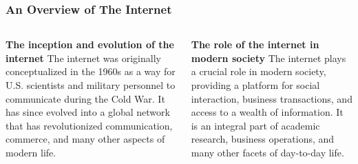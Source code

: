 \documentclass[5pt]{beamer}
\begin{document}
\begin{frame}
\frametitle{An Overview of The Internet}
\begin{columns}
\begin{column}{0.45\textwidth}
\begin{block}{\textbf{The inception and evolution of the internet}}
The internet was originally conceptualized in the 1960s as a way for U.S. scientists and military personnel to communicate during the Cold War. It has since evolved into a global network that has revolutionized communication, commerce, and many other aspects of modern life.
\end{block}
\end{column}
\begin{column}{0.45\textwidth}
\begin{block}{\textbf{The role of the internet in modern society}}
The internet plays a crucial role in modern society, providing a platform for social interaction, business transactions, and access to a wealth of information. It is an integral part of academic research, business operations, and many other facets of day-to-day life.
\end{block}
\end{column}
\end{columns}
\end{frame}
\end{document}
